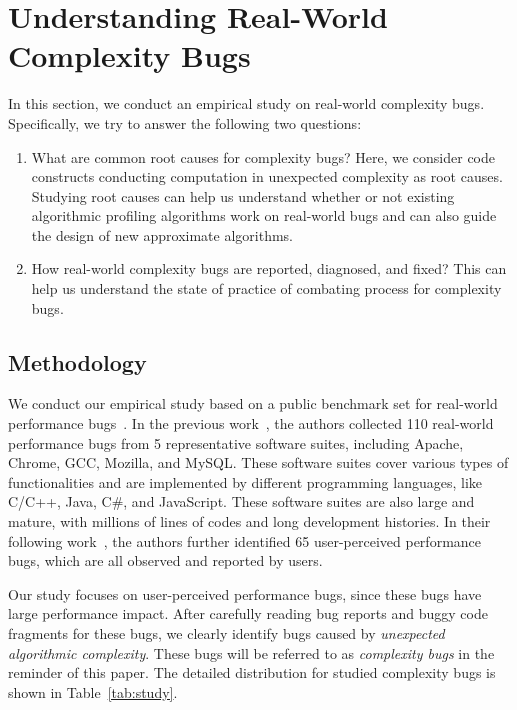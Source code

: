 \section{Understanding Real-World Complexity Bugs}
\label{sec:study}


In this section, we conduct an empirical study on real-world complexity bugs. 
Specifically, we try to answer the following two questions:

\begin{enumerate}

\item What are common root causes for complexity bugs? 
Here, we consider code constructs conducting computation in unexpected complexity as root causes. 
Studying root causes can help us understand whether or not 
existing algorithmic profiling algorithms work on real-world bugs 
and can also guide the design of new approximate algorithms. 

\item How real-world complexity bugs are reported, diagnosed, and fixed?
This can help us understand the state of practice of combating process for complexity bugs. 

\end{enumerate}


\subsection{Methodology}
\label{sec:meth}

We conduct our empirical study based on a public benchmark set for 
real-world performance bugs~\cite{PerfBug,SongOOPSLA2014}. 
In the previous work~\cite{PerfBug}, the authors collected 110 real-world 
performance bugs from 5 representative 
software suites, including Apache, Chrome, GCC, Mozilla, and MySQL. 
These software suites cover various types of functionalities and 
are implemented by different programming languages, 
like C/C++, Java, C\#, and JavaScript. 
These software suites are also large and mature, 
with millions of lines of codes and long development histories. 
In their following work~\cite{SongOOPSLA2014}, 
the authors further identified 65 user-perceived performance bugs, 
which are all observed and reported by users. 


Our study focuses on user-perceived performance bugs, 
since these bugs have large performance impact.
After carefully reading bug reports and buggy code fragments for these bugs,
we clearly identify \ComBugs bugs caused by {\textit{unexpected algorithmic complexity}}.
These bugs will be referred to as {\textit{complexity bugs}} in the reminder of this paper.
The detailed distribution for studied complexity bugs is shown in Table~\ref{tab:study}. 


